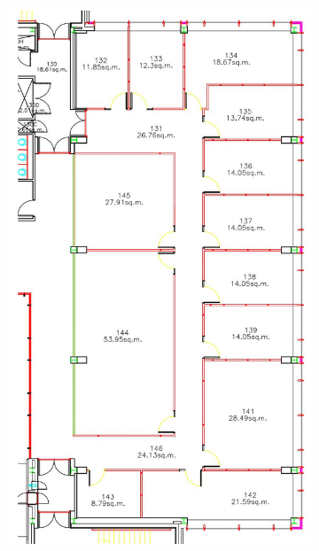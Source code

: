 \documentclass[a4paper,12pt,oneside,openright]{bhamthesis}
\begin{document}
\begin{figure}
		\centering
		\begin{subfigure}[b]{0.4\textwidth}
			\centering
			\includegraphics[width=\textwidth]{chapter5_fig/floorplan.png}
			\caption{}
			\label{subfig:floorplan}
		\end{subfigure}
		\hfill
		\begin{subfigure}[b]{0.49\textwidth}
			\centering

\end{subfigure}
\end{figure}
\end{document}
